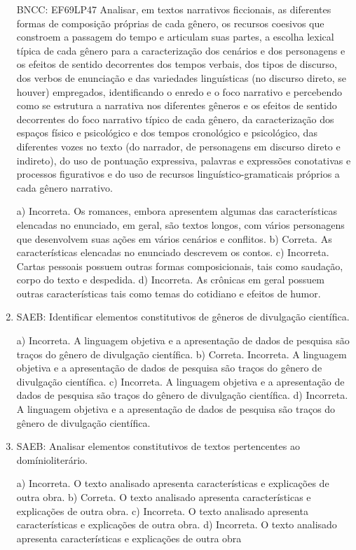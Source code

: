 \begin{enumerate}
BNCC: EF69LP47 Analisar, em textos narrativos ficcionais, as diferentes
formas de composição próprias de cada gênero, os recursos coesivos que
constroem a passagem do tempo e articulam suas partes, a escolha lexical
típica de cada gênero para a caracterização dos cenários e dos
personagens e os efeitos de sentido decorrentes dos tempos verbais, dos
tipos de discurso, dos verbos de enunciação e das variedades
linguísticas (no discurso direto, se houver) empregados, identificando o
enredo e o foco narrativo e percebendo como se estrutura a narrativa nos
diferentes gêneros e os efeitos de sentido decorrentes do foco narrativo
típico de cada gênero, da caracterização dos espaços físico e
psicológico e dos tempos cronológico e psicológico, das diferentes vozes
no texto (do narrador, de personagens em discurso direto e indireto), do
uso de pontuação expressiva, palavras e expressões conotativas e
processos figurativos e do uso de recursos linguístico-gramaticais
próprios a cada gênero narrativo.

a) Incorreta. Os romances, embora apresentem algumas das
características elencadas no enunciado, em geral, são textos longos, 
com vários personagens que desenvolvem suas ações em vários cenários 
e conflitos.
b) Correta. As características elencadas no enunciado descrevem os 
contos.
c) Incorreta. Cartas pessoais possuem outras formas composicionais, tais
como saudação, corpo do texto e despedida.
d) Incorreta. As crônicas em geral possuem outras características tais
como temas do cotidiano e efeitos de humor.

	\item
SAEB: Identificar elementos constitutivos de gêneros de divulgação
científica.

a) Incorreta. A linguagem objetiva e a apresentação de dados de pesquisa são 
traços do gênero de divulgação científica.
b) Correta.  Incorreta. A linguagem objetiva e a apresentação de dados de pesquisa são 
traços do gênero de divulgação científica.
c) Incorreta. A linguagem objetiva e a apresentação de dados de pesquisa são 
traços do gênero de divulgação científica.
d) Incorreta. A linguagem objetiva e a apresentação de dados de pesquisa são 
traços do gênero de divulgação científica.

	\item
SAEB: Analisar elementos constitutivos de textos pertencentes ao 
domínioliterário.

a) Incorreta. O texto analisado apresenta características e explicações de outra obra.
b) Correta. O texto analisado apresenta características e explicações de outra obra.
c) Incorreta. O texto analisado apresenta características e explicações de outra obra.
d) Incorreta. O texto analisado apresenta características e explicações de outra obra


\end{enumerate}
